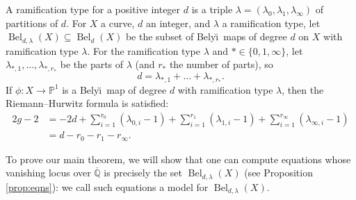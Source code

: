\documentclass{amsproc}
\numberwithin{equation}{section}
\numberwithin{figure}{section}
\newtheorem{lemma}[equation]{Lemma}
\theoremstyle{definition}
\theoremstyle{remark}
\DeclareMathOperator{\Spec}{Spec}
\newcommand{\Qbar}{\overline{\mathbb{Q}}}
\newcommand\PP{\mathbb{P}}
\DeclareMathOperator{\Bel}{Bel}
\newcommand{\Belyi}{Bely\u{\i}}
\newcommand{\defi}[1]{\textsf{#1}} 	%
\begin{document}


A \defi{ramification type} for a positive integer $d$ is a triple $\lambda = (\lambda_0,\lambda_1,\lambda_\infty)$ of partitions of $d$. For $X$ a curve, $d$ an integer, and $\lambda$ a ramification type, let $\Bel_{d,\lambda}(X) \subseteq \Bel_d(X)$ be the subset of \Belyi\ maps of degree $d$ on $X$ with ramification type $\lambda$.  For the ramification type $\lambda$ and $* \in \{0,1,\infty\}$, let $\lambda_{*,1},\dots,\lambda_{*,r_*}$ be the parts of $\lambda$ (and $r_*$ the number of parts), so
\[ d = \lambda_{*,1} + \dots + \lambda_{*,r_*}. \]
If $\phi\colon X \to \PP^1$ is a \Belyi\ map of degree $d$ with ramification type $\lambda$, then the Riemann--Hurwitz formula is satisfied: 
\begin{equation} \label{eqn:riemmanhurwitzbel}
\begin{aligned}
2g-2 &= -2 d + \sum_{i=1}^{r_0} \left(\lambda_{0,i} - 1\right) + \sum_{i=1}^{r_1} \left(\lambda_{1,i} - 1\right)
+ \sum_{i=1}^{r_\infty} \left(\lambda_{\infty,i} - 1\right) \\
&= d-r_0 - r_1 - r_\infty.
\end{aligned}
\end{equation}

To prove our main theorem, we will show that one can compute equations whose vanishing locus over $\Qbar$ is precisely the set $\Bel_{d,\lambda}(X)$ (see Proposition \ref{prop:eqns}): we call such equations a \defi{model} for $\Bel_{d,\lambda}(X)$.
\end{document}
